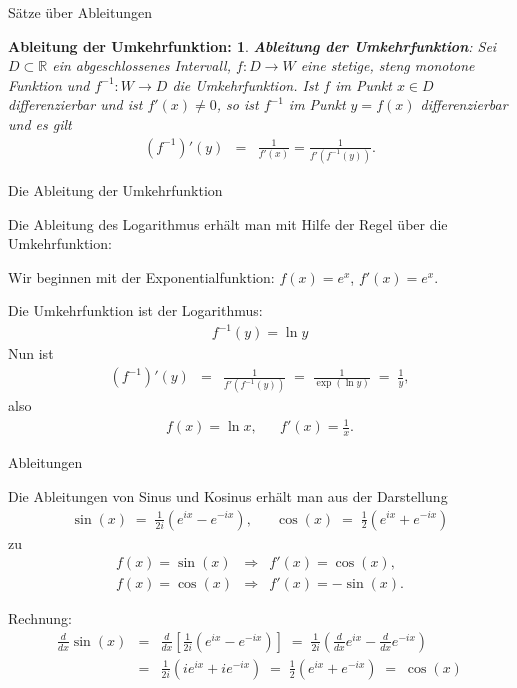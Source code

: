 \documentclass[german]{beamer}
\newcommand{\bq}{\begin{eqnarray*}}
\newcommand{\eq}{\end{eqnarray*}}
\newtheorem*{mytheorem26}{Ableitung der Umkehrfunktion:}
\begin{document}
\begin{frame}{S\"atze \"uber Ableitungen}

\begin{mytheorem26}
{\bf Ableitung der Umkehrfunktion}:
Sei $D \subset \mathbb R$ ein abgeschlossenes Intervall, $f : D \rightarrow W$ eine stetige, steng monotone
Funktion und $f^{-1} : W \rightarrow D$ die Umkehrfunktion.
Ist $f$ im Punkt $x\in D$ differenzierbar und ist $f'(x) \neq 0$, so ist $f^{-1}$ im Punkt $y=f(x)$
differenzierbar und es gilt
\bq
 \left( f^{-1} \right)'(y) & = & \frac{1}{f'\left(x\right)} = \frac{1}{f'\left(f^{-1}(y)\right)}.
\eq
\end{mytheorem26}

\end{frame}

\begin{frame}{Die Ableitung der Umkehrfunktion}

\begin{example}
Die Ableitung des \alert{Logarithmus} erh\"alt man mit Hilfe der Regel \"uber die Umkehrfunktion:

Wir beginnen mit der Exponentialfunktion: $f(x)=e^x$, $f'(x)=e^x$.

Die Umkehrfunktion ist der Logarithmus: 
\bq
 f^{-1}(y)=\ln y
\eq
Nun ist
\bq
 (f^{-1})'(y) & = & \frac{1}{f'(f^{-1}(y))} \; = \; \frac{1}{\exp(\ln y)} \; = \; \frac{1}{y},
\eq 
also
\bq
 f(x) = \ln x, & & f'(x) = \frac{1}{x}.
\eq
\end{example}

\end{frame}

\begin{frame}{Ableitungen}

\begin{example}
Die Ableitungen von \alert{Sinus} und \alert{Kosinus} erh\"alt man aus der Darstellung
\bq
 \sin(x) \; = \; \frac{1}{2i} \left(e^{ix}-e^{-ix}\right), & & \cos(x) \; = \; \frac{1}{2}\left(e^{ix}+e^{-ix}\right)
\eq 
zu
\bq
 f(x) = \sin(x) & \Rightarrow & f'(x) = \cos(x),
 \nonumber \\
 f(x) = \cos(x) & \Rightarrow & f'(x) = -\sin(x).
\eq
\end{example}
Rechnung:
\bq
 \frac{d}{dx} \sin\left(x\right)
 & = &
 \frac{d}{dx} \left[ \frac{1}{2i} \left(e^{ix}-e^{-ix}\right) \right]
 \; = \;
 \frac{1}{2i} \left(\frac{d}{dx}e^{ix}-\frac{d}{dx}e^{-ix}\right)
 \nonumber \\
 & = &
 \frac{1}{2i} \left(ie^{ix}+ie^{-ix}\right)
 \; = \;
 \frac{1}{2} \left(e^{ix}+e^{-ix}\right)
 \; = \;
 \cos\left(x\right)
\eq

\end{frame}
\end{document}
